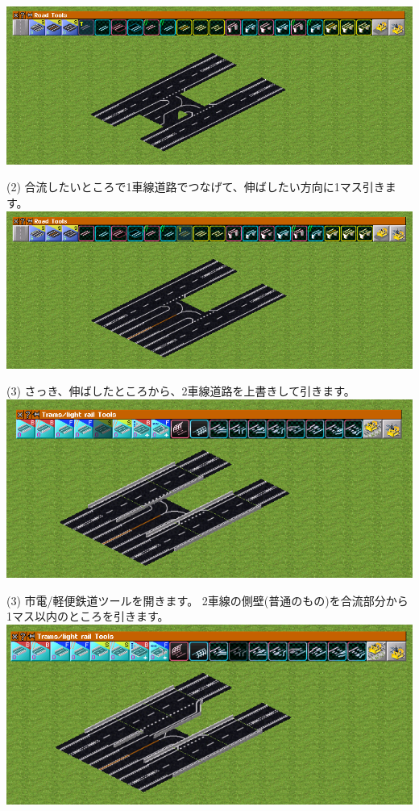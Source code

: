 \documentclass{jarticle}
\begin{document}
  \includegraphics[width = 135mm]{picture/20210214-road-1-2.png}

  (2)
  合流したいところで1車線道路でつなげて、伸ばしたい方向に1マス引きます。
  \\


  \includegraphics[width = 135mm]{picture/20210214-road-1-3.png}

  (3)
  さっき、伸ばしたところから、2車線道路を上書きして引きます。
  \\



  \includegraphics[width = 135mm]{picture/20210214-road-1-4.png}

  (3)
  市電/軽便鉄道ツールを開きます。
  2車線の側壁(普通のもの)を合流部分から1マス以内のところを引きます。
  \\


  \includegraphics[width = 135mm]{picture/20210214-road-1-5.png}
\end{document}
